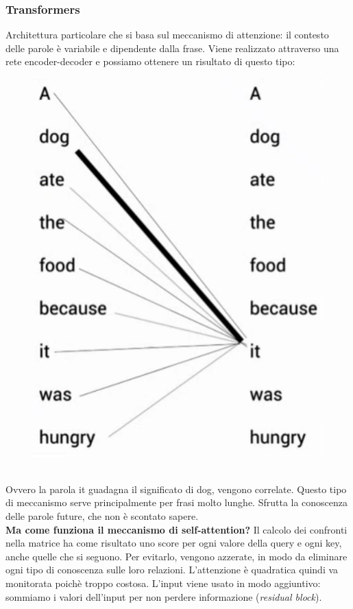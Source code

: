 \subsubsection{Transformers}
Architettura particolare che si basa sul meccanismo di attenzione: il contesto delle parole è variabile e dipendente dalla frase. Viene realizzato attraverso una rete encoder-decoder e possiamo ottenere un risultato di questo tipo:
\\
\begin{figure}[th]
    \centering
    \includegraphics[scale=0.5]{Text Analysis/img/selfattention.png}
\end{figure}
\\
Ovvero la parola it guadagna il significato di dog, vengono correlate. Questo tipo di meccanismo serve principalmente per frasi molto lunghe. Sfrutta la conoscenza delle parole future, che non è scontato sapere. 
\\
\textbf{Ma come funziona il meccanismo di self-attention?} Il calcolo dei confronti nella matrice ha come risultato uno score per ogni valore della query e ogni key, anche quelle che si seguono. Per evitarlo, vengono azzerate, in modo da eliminare ogni tipo di conoscenza sulle loro relazioni. L'attenzione è quadratica quindi va monitorata poichè troppo costosa. L'input viene usato in modo aggiuntivo: sommiamo i valori dell'input per non perdere informazione (\textit{residual block}).

